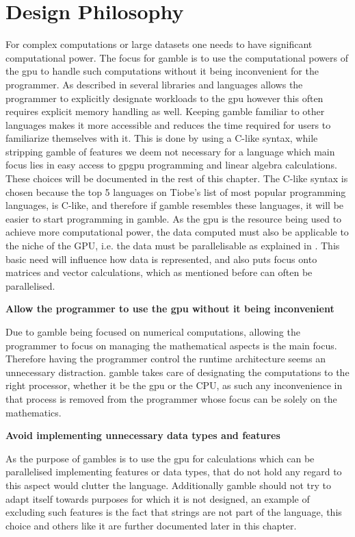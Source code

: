 \section{Design Philosophy}
For complex computations or large datasets one needs to have significant computational power.
The focus for \gls{gamble} is to use the computational powers of the \acrshort{gpu} to handle such computations without it being inconvenient for the programmer.
As described in  several libraries and languages allows the programmer to explicitly designate workloads to the \acrshort{gpu} however this often requires explicit memory handling as well.
Keeping \gls{gamble} familiar to other languages makes it more accessible and reduces the time required for users to familiarize themselves with it.
This is done by using a C-like syntax, while stripping \gls{gamble} of features we deem not necessary for a language which main focus lies in easy access to \acrshort{gpgpu} programming and linear algebra calculations.
These choices will be documented in the rest of this chapter.
The C-like syntax is chosen because the top 5 languages on Tiobe's list of most popular programming languages, is C-like, and therefore if \gls{gamble} resembles these languages, it will be easier to start programming in \gls{gamble}.\citep{TIOBE}
As the \acrshort{gpu} is the resource being used to achieve more computational power, the data computed must also be applicable to the niche of the GPU, i.e. the data must be parallelisable as explained in .
This basic need will influence how data is represented, and also puts focus onto matrices and vector calculations, which as mentioned before can often be parallelised.

\textbf{Allow the programmer to use the \acrshort{gpu} without it being inconvenient}

Due to \gls{gamble} being focused on numerical computations, allowing the programmer to focus on managing the mathematical aspects is the main focus.
Therefore having the programmer control the runtime architecture seems an unnecessary distraction.
\gls{gamble} takes care of designating the computations to the right processor, whether it be the \acrshort{gpu} or the CPU, as such any inconvenience in that process is removed from the programmer whose focus can be solely on the mathematics.

\textbf{Avoid implementing unnecessary data types and features}

As the purpose of \glspl{gamble} is to use the \acrshort{gpu} for calculations which can be parallelised implementing features or data types, that do not hold any regard to this aspect would clutter the language.
Additionally \gls{gamble} should not try to adapt itself towards purposes for which it is not designed, an example of excluding such features is the fact that strings are not part of the language, this choice and others like it are further documented later in this chapter.


